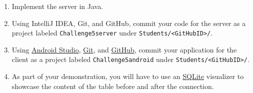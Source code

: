 \documentclass[11pt]{article}
\begin{document}
\begin{enumerate}
\item Implement the server in Java.
\item Using IntelliJ IDEA, Git, and GitHub, commit your code for the server as a project labeled \texttt{Challenge5server} under \texttt{Students/<GitHubID>/}.
\item Using \href{http://developer.android.com/sdk/index.html}{Android Studio}, \href{http://git-scm.com/}{Git}, and \href{https://GitHub.com}{GitHub}, commit your application for the client as a project labeled \texttt{Challenge5android} under \texttt{Students/<GitHubID>/}.
\item As part of your demonstration, you will have to use an \href{http://www.sqlite.org/}{SQLite} visualizer to showcase the content of the table before and after the connection.
\end{enumerate}
\end{document}

